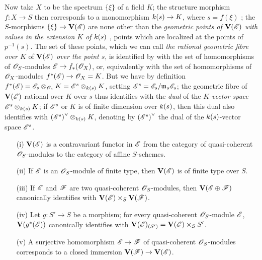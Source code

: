 \begin{env}[1.7.10]
\label{2.1.7.10}
Now take $X$ to be the spectrum $\{\xi\}$ of a field $K$; the structure morphism $f:X\to S$ then corresponfs to a monomorphism $\kres(s)\to K$, where $s=f(\xi)$ ; the $S$-morphisms $\{\xi\}\to\bb{V}(\sh{E})$ are none other than the \emph{geometric points of $\mathbf{V}(\mathscr{E})$ with values in the extension $K$ of $k(s)$} , points which are localized at the points of $p^{-1}(s)$.
The set of these points, which we can call \emph{the rational geometric fibre over $K$} of $\mathbf{V}(\mathscr{E})$ \emph{over the point $s$}, is identified by  with the set of homomorphisms of $\mathscr{O}_S$-modules $\sh{E}\to f_*(\sh{O}_X)$, or, equivalently  with the set of homomorphisms of $\mathscr{O}_X$-modules $f^*(\sh{E})\to\sh{O}_X=K$.
But we have by definition  $f^*(\mathscr{E})=\mathscr{E}_s\otimes_{\mathscr{O}_s}K=\mathscr{E}^s\otimes_{k(s)}K$, setting $\mathscr{E}^s=\mathscr{E}_s/\mathfrak{m}_s\mathscr{E}_s$; the geometric fibre of $\mathbf{V}(\mathscr{E})$ rational over $K$ over $s$ thus identifies with the \emph{dual} of the \emph{$K$-vector space $\mathscr{E}^s\otimes_{k(s)}K$}; if $\mathscr{E}^s$ or $K$ is of finite dimension over $k(s)$, then this dual also identifies with ${(\mathscr{E}^s)}^\vee\otimes_{k(s)}K$, denoting by ${(\mathscr{E}^s)}^\vee$ the dual of the $k(s)$-vector space $\mathscr{E}^s$.
\end{env}

\begin{proposition}[1.7.11]
\label{2.1.7.11}
\medskip\noindent
\begin{enumerate}
  \item[{\rm(i)}] $\mathbf{V}(\mathscr{E})$ is a contravariant functor in $\mathscr{E}$ from the category of quasi-coherent $\mathscr{O}_S$-modules to the category of affine $S$-schemes.
  \item[{\rm(ii)}] If $\mathscr{E}$ is an $\mathscr{O}_S$-module of finite type, then $\mathbf{V}(\mathscr{E})$ is of finite type over $S$.
  \item[{\rm(iii)}] If $\mathscr{E}$ and $\mathscr{F}$ are two quasi-coherent $\mathscr{O}_S$-modules, then $\mathbf{V}(\mathscr{E}\oplus\mathscr{F})$ canonically identifies with $\mathbf{V}(\mathscr{E})\times_S\mathbf{V}(\mathscr{F})$.
  \item[{\rm(iv)}] Let $g:S'\to S$ be a morphism; for every quasi-coherent $\mathscr{O}_S$-module $\mathscr{E}$, $\mathbf{V}(g^*(\mathscr{E}))$ canonically identifies with $\mathbf{V}(\mathscr{E})_{(S')}=\mathbf{V}(\mathscr{E})\times_S S'$.
  \item[{\rm(v)}] A surjective homomorphism $\sh{E}\to\sh{F}$ of quasi-coherent $\mathscr{O}_S$-modules corresponds to a closed immersion $\bb{V}(\sh{F})\to\bb{V}(\sh{E})$.
\end{enumerate}
\end{proposition}

